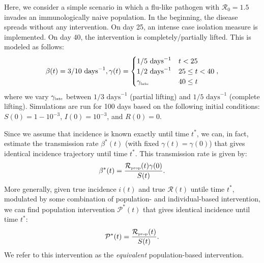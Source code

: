 \documentclass[12pt]{article}
\newcommand{\Rx}[1]{\ensuremath{{\mathcal R}_{#1}}\xspace}
\newcommand{\Ro}{\Rx{0}}
\newcommand{\RR}{\ensuremath{{\mathcal R}}\xspace}
\newcommand{\tsub}[2]{#1_{{\textrm{\tiny #2}}}}
\newcommand{\PP}{{\mathcal P}}
\begin{document}
Here, we consider a simple scenario in which a flu-like pathogen with $\Ro = 1.5$ invades an immunologically naive population.
In the beginning, the disease spreads without any intervention.
On day 25, an intense case isolation measure is implemented. 
On day 40, the intervention is completely/partially lifted.
This is modeled as follows:
\begin{equation}
\beta(t) = 3/10\,\,\textrm{days}^{-1}, \gamma(t) = \begin{cases}
1/5\,\, \textrm{days}^{-1} & t < 25\\
1/2\,\, \textrm{days}^{-1} & 25 \leq t < 40 \\
\tsub{\gamma}{late} & 40 \leq t
\end{cases},
\end{equation}
where we vary $\tsub{\gamma}{late}$ between $1/3\,\, \textrm{days}^{-1}$ (partial lifting) and $1/5\,\, \textrm{days}^{-1}$ (complete lifting).
Simulations are run for 100 days based on the following initial conditions: $S(0) = 1 - 10^{-3}$, $I(0) = 10^{-3}$, and $R(0) = 0$.

Since we assume that incidence is known exactly until time $t^\ast$, we can, in fact, estimate the transmission rate $\beta^\ast(t)$ (with fixed $\gamma(t)=\gamma(0)$) that gives identical incidence trajectory until time $t^\ast$.
This transmission rate is given by:
\begin{equation}
\beta^\ast(t) = \frac{\tsub{\RR}{prop}(t)\gamma(0)}{S(t)}.
\end{equation}
More generally, given true incidence $i(t)$ and true $\RR(t)$ untile time $t^\ast$, modulated by some combination of population- and individual-based intervention, we can find population intervention $\PP^\ast(t)$ that gives identical incidence until time $t^\ast$:
\begin{equation}
\PP^\ast(t) = \frac{\tsub{\RR}{prop}(t)}{S(t)}.
\end{equation}
We refer to this intervention as the \emph{equivalent} population-based intervention.
\end{document}
